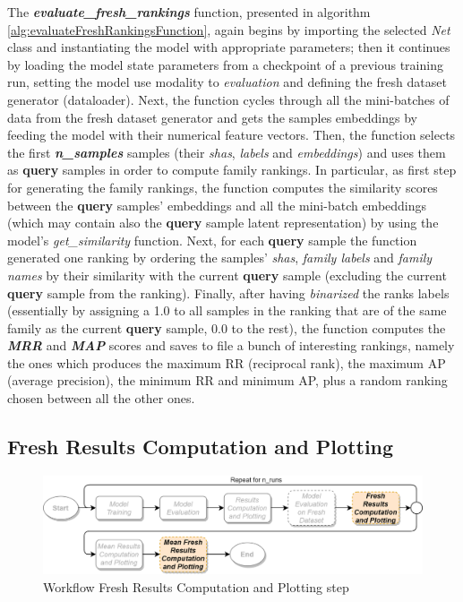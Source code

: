 \documentclass[pdfa%
,cucitura%
]{toptesi}
\begin{document}
The \textbf{\textit{evaluate\_fresh\_rankings}} function, presented in algorithm \ref{alg:evaluateFreshRankingsFunction}, again begins by importing the selected \textit{Net} class and instantiating the model with appropriate parameters; then it continues by loading the model state parameters from a checkpoint of a previous training run, setting the model use modality to \textit{evaluation} and defining the fresh dataset generator (dataloader). Next, the function cycles through all the mini-batches of data from the fresh dataset generator and gets the samples embeddings by feeding the model with their numerical feature vectors. Then, the function selects the first \textbf{\textit{n\_samples}} samples (their \textit{shas}, \textit{labels} and \textit{embeddings}) and uses them as \textbf{query} samples in order to compute family rankings. In particular, as first step for generating the family rankings, the function computes the similarity scores between the \textbf{query} samples' embeddings and all the mini-batch embeddings (which may contain also the \textbf{query} sample latent representation) by using the model's \textit{get\_similarity} function. Next, for each \textbf{query} sample the function generated one ranking by ordering the samples' \textit{shas}, \textit{family labels} and \textit{family names} by their similarity with the current \textbf{query} sample (excluding the current \textbf{query} sample from the ranking). Finally, after having \textit{binarized} the ranks labels (essentially by assigning a 1.0 to all samples in the ranking that are of the same family as the current \textbf{query} sample, 0.0 to the rest), the function computes the \textbf{\textit{MRR}} and \textbf{\textit{MAP}} scores and saves to file a bunch of interesting rankings, namely the ones which produces the maximum RR (reciprocal rank), the maximum AP (average precision), the minimum RR and minimum AP, plus a random ranking chosen between all the other ones.

\subsection{Fresh Results Computation and Plotting}
\begin{figure}[h!]
	\centering
	\includegraphics[width=\textwidth]{./images/workflow_fresh_results.png}
	\caption[Fresh results computation and plotting workflow step]{Workflow Fresh Results Computation and Plotting step}
	\label{fig:workflow_fresh_results}
\end{figure}
\end{document}
